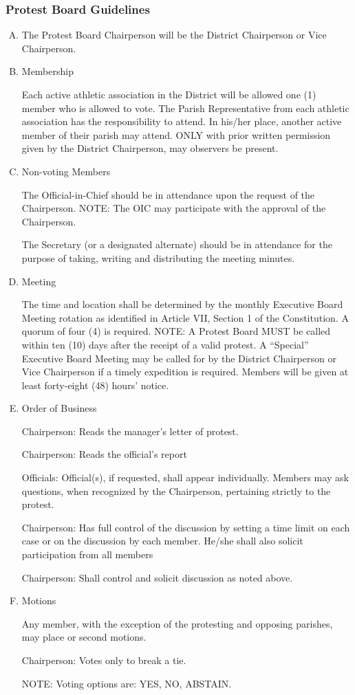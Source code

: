 \documentclass[draft]{memoir}
\begin{document}
\subsubsection{Protest Board Guidelines}
\begin{enumerate}[A.]
    \item The Protest Board Chairperson will be the District Chairperson or Vice Chairperson.
    \item Membership

    Each active athletic association in the District will be allowed one (1) member who is allowed to vote.  The Parish Representative from each athletic association has the responsibility to attend.  In his/her place, another active member of their parish may attend.  ONLY with prior written permission given by the District Chairperson, may observers be present.
    \item Non-voting Members 

	The Official-in-Chief should be in attendance upon the request of the Chairperson.  NOTE:  The OIC may participate with the approval of the Chairperson. 

	The Secretary (or a designated alternate) should be in attendance for the purpose of taking, writing and distributing the meeting minutes.  
    \item Meeting   

	The time and location shall be determined by the monthly Executive Board Meeting rotation as identified in Article VII, Section 1 of the Constitution.  A quorum of four (4) is required.  NOTE:  A Protest Board MUST be called within ten (10) days after the receipt of a valid protest.  A “Special” Executive Board Meeting may be called for by the District Chairperson or Vice Chairperson if a timely expedition is required. Members will be given at least forty-eight (48) hours’ notice.

    \item Order of Business
	
       Chairperson:
       Reads the manager's letter of protest.
	
	Chairperson:
       Reads the official's report

       Officials:  
       Official(s), if requested, shall appear individually.  Members may ask questions, when recognized by the 
       Chairperson, pertaining strictly to the protest.

	Chairperson:
       Has full control of the discussion by setting a time limit on each case or on the discussion by each member. 
       He/she shall also solicit participation from all members

	Chairperson:  
       Shall control and solicit discussion as noted above.

    \item Motions

    Any member, with the exception of the protesting and opposing parishes, may place or second motions.

    Chairperson:  Votes only to break a tie.
    
    NOTE:  Voting options are:  YES, NO, ABSTAIN.
\end{enumerate}
\end{document}

